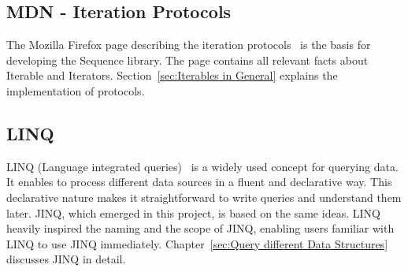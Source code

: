 \subsection{MDN - Iteration Protocols}
\label{sub:MDN - Iteration Protocols}
The Mozilla Firefox page describing the iteration
protocols~\cite{mdn_protocols} is the basis for developing the Sequence
library. The page contains all relevant facts about Iterable and Iterators.
Section~\ref{sec:Iterables in General} explains the implementation
of protocols.

\subsection{LINQ}
\label{sub:LINQ}
LINQ (Language integrated queries)~\cite{billwagner_language-integrated_2023}
is a widely used concept for querying data. It enables to process different
data sources in a fluent and declarative way. This declarative nature makes it
straightforward to write queries and understand them later. JINQ, which emerged
in this project, is based on the same ideas. LINQ heavily inspired the naming
and the scope of JINQ, enabling users familiar with LINQ to use JINQ
immediately. Chapter~\ref{sec:Query different Data Structures} discusses JINQ
in detail.
